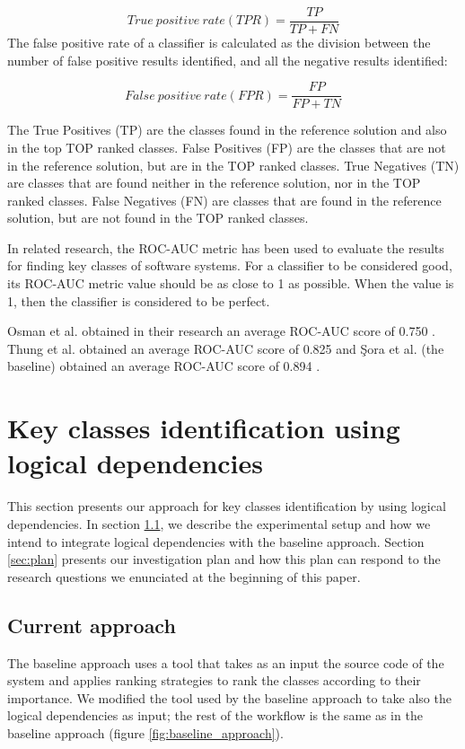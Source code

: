 \documentclass[runningheads]{comsis2}
\begin{document}
\begin{equation}
 True\ positive\ rate (TPR) = \frac{TP}{TP+FN}
\end{equation}
The false positive rate of a classifier is calculated as the division between the number of false positive results identified, and all the negative results identified:

\begin{equation}
 False\ positive\ rate (FPR) = \frac{FP}{FP+TN}
\end{equation}

The True Positives (TP) are the classes found in the reference solution and also in the top TOP ranked classes. False Positives (FP) are the classes that are not in the reference solution, but are in the TOP ranked classes.
True Negatives (TN) are classes that are found neither in the reference solution, nor in the TOP ranked classes. False Negatives (FN) are classes that are found in the reference solution, but are not found in the TOP ranked classes.

In related research, the ROC-AUC metric has been used to evaluate the results for finding key classes of software systems.
For a classifier to be considered good, its ROC-AUC metric value should be as close to 1 as possible. When the value is 1, then the classifier is considered to be perfect.

Osman et al. obtained in their research an average ROC-AUC score of 0.750 \cite{6676885}. Thung et al. obtained an average ROC-AUC score of 0.825 \cite{rocclasification}  and Şora et al. (the baseline) obtained an average ROC-AUC score of 0.894 \cite{Finding-key-classes}.



\section{Key classes identification using logical dependencies}
\label{sec:keycalss_identification}
This section presents our approach for key classes identification by using logical dependencies. 
In section \ref{sec:current_approach}, we describe the experimental setup and how we intend to integrate logical dependencies with the baseline approach. 
Section \ref{sec:plan} presents our investigation plan and how this plan can respond to the research questions we enunciated at the beginning of this paper.

\subsection{Current approach}
\label{sec:current_approach}
The baseline approach uses a tool that takes as an input the source code of the system and applies ranking strategies to rank the classes according to their importance. We modified the tool used by the baseline approach to take also the logical dependencies as input; the rest of the workflow is the same as in the baseline approach (figure \ref{fig:baseline_approach}).
\end{document}
